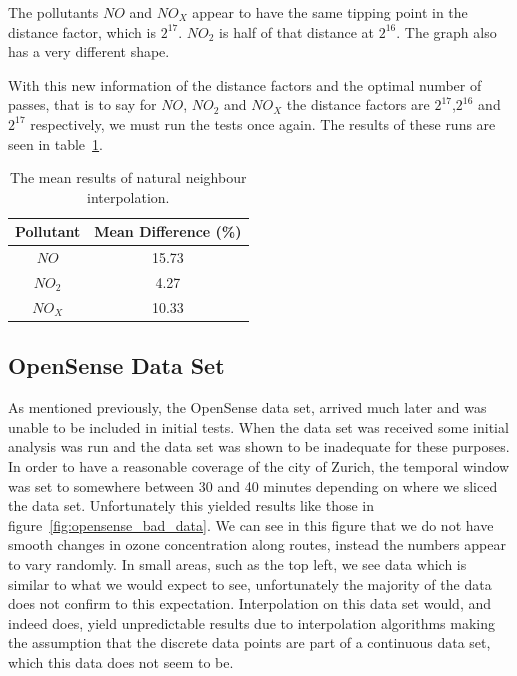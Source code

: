         	The pollutants $NO$ and $NO_{X}$ appear to have the same tipping point in the distance factor, which is $2^{17}$. $NO_{2}$ is half of that distance at $2^{16}$. The graph also has a very different shape. 

        	With this new information of the distance factors and the optimal number of passes, that is to say for $NO$, $NO_{2}$ and $NO_{X}$ the distance factors are $2^{17}$,$2^{16}$ and $2^{17}$ respectively, we must run the tests once again. The results of these runs are seen in table~\ref{tab:barnes_results}.

        	\begin{table}
				\centering
	    		\begin{tabular}{|c|c|}
	    			\hline
					Pollutant & Mean Difference (\%) \\ \hline
					$NO$ & 15.73 \\
					$NO_{2}$ & 4.27 \\
					$NO_{X}$ & 10.33 \\
					\hline
				\end{tabular}
				\caption{The mean results of natural neighbour interpolation.}
				\label{tab:barnes_results}
			\end{table} 

		\subsection{OpenSense Data Set}\label{prediction_evaluation_results_opensense_data_set}

			As mentioned previously, the OpenSense data set, arrived much later and was unable to be included in initial tests. When the data set was received some initial analysis was run and the data set was shown to be inadequate for these purposes. In order to have a reasonable coverage of the city of Zurich, the temporal window was set to somewhere between 30 and 40 minutes depending on where we sliced the data set. Unfortunately this yielded results like those in figure~\ref{fig:opensense_bad_data}. We can see in this figure that we do not have smooth changes in ozone concentration along routes, instead the numbers appear to vary randomly. In small areas, such as the top left, we see data which is similar to what we would expect to see, unfortunately the majority of the data does not confirm to this expectation. Interpolation on this data set would, and indeed does, yield unpredictable results due to interpolation algorithms making the assumption that the discrete data points are part of a continuous data set, which this data does not seem to be. 

